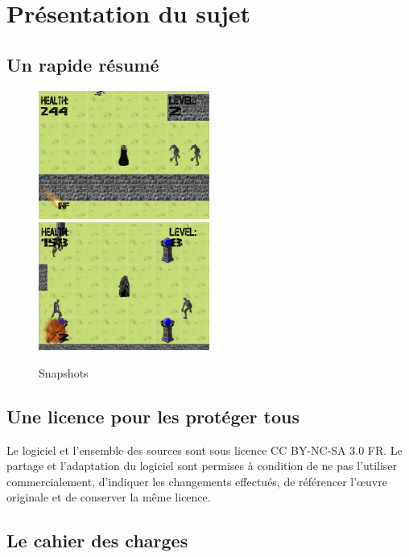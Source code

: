 \section{Présentation du sujet} %

\subsection{Un rapide résumé}

\begin{figure}[!ht]
    \includegraphics[width=0.5\textwidth]{./images/snapshot1.png}
    \includegraphics[width=0.5\textwidth]{./images/snapshot2.png}
    \caption{Snapshots}
\end{figure}

\subsection{Une licence pour les protéger tous}

Le logiciel et l'ensemble des sources sont sous licence CC BY-NC-SA 3.0 FR. Le partage et l'adaptation du logiciel sont permises à condition de ne pas l'utiliser
commercialement, d'indiquer les changements effectués, de référencer l’œuvre originale et 
de conserver la même licence.

\subsection{Le cahier des charges}
